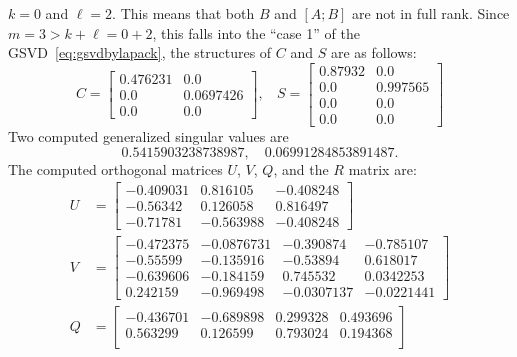 \begin{example}
{\begin{enumerate}[(1).]
$k = 0$ and $\ell = 2$. This means that both $B$ and $[A; B]$ are not 
in full rank. 
Since $m = 3 > k+\ell = 0 + 2$, this falls into the ``case 1'' of
the GSVD~\eqref{eq:gsvdbylapack}, the structures of $C$ and $S$ are as follows: 
\begin{equation*}
                C = \begin{bmatrix}
                     0.476231 & 0.0  \\     
                     0.0      & 0.0697426 \\
                     0.0      & 0.0      
                \end{bmatrix}, \ \ \ \
                S = \begin{bmatrix}
                     0.87932 & 0.0    \\  
                     0.0     & 0.997565 \\
                     0.0     & 0.0  \\   
                     0.0     & 0.0   
                \end{bmatrix}
            \end{equation*}
Two computed generalized singular values are 
\[ 
0.5415903238738987, \quad 
0.06991284853891487.
\] 
The computed orthogonal matrices $U$, $V$, $Q$, and the $R$ matrix are: 
\begin{align*}
                U &= \begin{bmatrix}
                 -0.409031 &  0.816105 & -0.408248 \\
                 -0.56342  &  0.126058 &  0.816497 \\
                 -0.71781  & -0.563988 & -0.408248
                \end{bmatrix} \\
                V &= \begin{bmatrix}
                 -0.472375 & -0.0876731 & -0.390874  & -0.785107  \\
                 -0.55599  & -0.135916  & -0.53894   &  0.618017  \\
                 -0.639606 & -0.184159  &  0.745532  &  0.0342253 \\
                  0.242159 & -0.969498  & -0.0307137 & -0.0221441
                \end{bmatrix} \\
                Q &= \begin{bmatrix}
                 -0.436701 & -0.689898 &  0.299328  &  0.493696 \\
                  0.563299 &  0.126599 &  0.793024  &  0.194368 \\

\end{bmatrix}
\end{align*}
\end{enumerate}}
\end{example}
